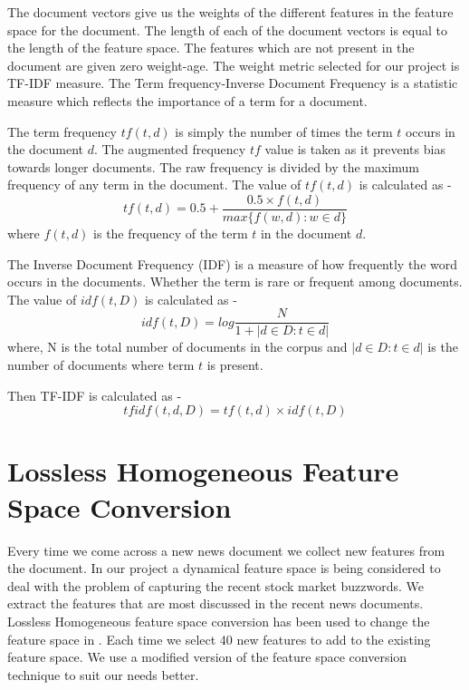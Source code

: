 \documentclass[a4paper,12bp]{report}
\begin{document}
The document vectors give us the weights of the different features in the feature space for the document. The length of each of the document vectors is equal to the length of the feature space. The features which are not present in the document are given zero weight-age. The weight metric selected for our project is TF-IDF measure. The Term frequency-Inverse Document Frequency is a statistic measure which reflects the importance of a term for a document.

The term frequency $tf(t,d)$ is simply the number of times the term $t$ occurs in the document $d$. The augmented frequency $tf$ value is taken as it prevents bias towards longer documents. The raw frequency is divided by the maximum frequency of any term in the document. The value of $tf(t,d)$ is calculated as -
\begin{equation}
tf(t,d) = 0.5 + \frac{0.5 \times f(t,d)}{max\{ f(w,d) : w \in d \}}
\end{equation}
where $f(t,d)$ is the frequency of the term $t$ in the document $d$. 

The Inverse Document Frequency (IDF) is a measure of how frequently the word occurs in the documents. Whether the term is rare or frequent among documents. The value of $idf(t,D)$ is calculated as - 
\begin{equation} 
idf(t,D) = log \frac{N}{1 + |d \in D : t \in d|}
\end{equation}
where, N is the total number of documents in the corpus and $|d \in D : t \in d|$ is the number of documents where term $t$ is present. 

Then TF-IDF is calculated as -
\begin{equation} 
\label{eq:tfidf}
tfidf(t,d,D) = tf(t,d) \times idf(t,D)
\end{equation}

\section{Lossless Homogeneous Feature Space Conversion}
\label{sec:lhfs}

Every time we come across a new news document we collect new features from the document. In our project a dynamical feature space is being considered to deal with the problem of capturing the recent stock market buzzwords. We extract the features that are most discussed in the recent news documents. Lossless Homogeneous feature space conversion has been used to change the feature space in \cite{Masud:2010}. Each time we select 40 new features to add to the existing feature space. We use a modified version of the feature space conversion technique to suit our needs better. 
\end{document}
